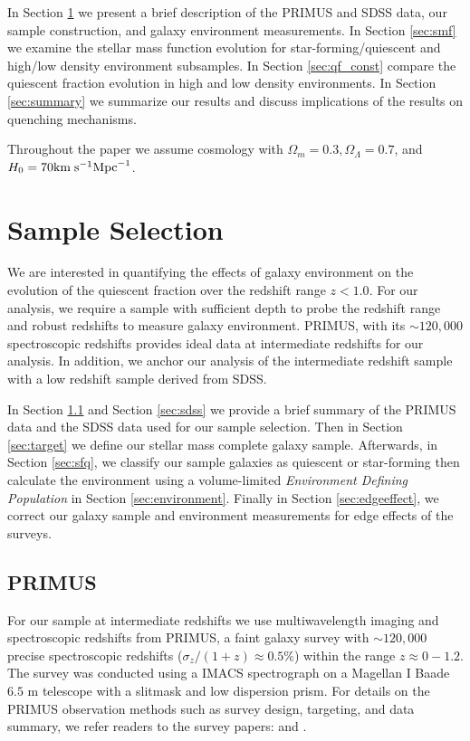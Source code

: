 \documentclass{emulateapj}
\begin{document}
In Section \ref{sec:sample} we present a brief description of the PRIMUS and SDSS data, our sample construction, and galaxy environment measurements. In Section \ref{sec:smf} we examine the stellar mass function evolution for star-forming/quiescent and high/low density environment subsamples. In Section \ref{sec:qf_const} compare the quiescent fraction evolution in high and low density environments. In Section \ref{sec:summary} we summarize our results and discuss implications of the results on quenching mechanisms. 

Throughout the paper we assume cosmology with $\Omega_{m} = 0.3, \Omega_{\Lambda} = 0.7$, and $H_0 = 70 \rm{km} \; \rm{s}^{-1} \rm{Mpc}^{-1}$.

\section{Sample Selection} \label{sec:sample}
We are interested in quantifying the effects of galaxy environment on the evolution of the quiescent fraction over the redshift range $ z < 1.0$. For our analysis, we require a sample with sufficient depth to probe the redshift range and robust redshifts to measure galaxy environment. PRIMUS, with its $\sim 120,000$ spectroscopic redshifts provides ideal data at intermediate redshifts for our analysis. In addition, we anchor our analysis of the intermediate redshift sample with a low redshift sample derived from SDSS. 

In Section \ref{sec:primus} and Section \ref{sec:sdss} we provide a brief summary of the PRIMUS data and the SDSS data used for our sample selection. Then in Section \ref{sec:target} we define our stellar mass complete galaxy sample. Afterwards, in Section \ref{sec:sfq}, we classify our sample galaxies as quiescent or star-forming then calculate the environment using a volume-limited {\em Environment Defining Population} in Section \ref{sec:environment}. 
Finally in Section \ref{sec:edgeeffect}, we correct our galaxy sample and environment measurements for edge effects of the surveys. 

\subsection{PRIMUS} \label{sec:primus}
For our sample at intermediate redshifts we use multiwavelength imaging and spectroscopic redshifts from PRIMUS, a faint galaxy survey with $\sim 120,000$ precise spectroscopic redshifts ($\sigma_z/(1+z) \approx 0.5 \%$) within the range $z \approx 0-1.2$. The survey was conducted using a IMACS spectrograph on a Magellan I Baade $6.5$ m telescope with a slitmask and low dispersion prism. For details on the PRIMUS observation methods such as survey design, targeting, and data summary, we refer readers to the survey papers: \cite{Coil:2011aa} and \cite{Cool:2013aa}. 
\end{document}
